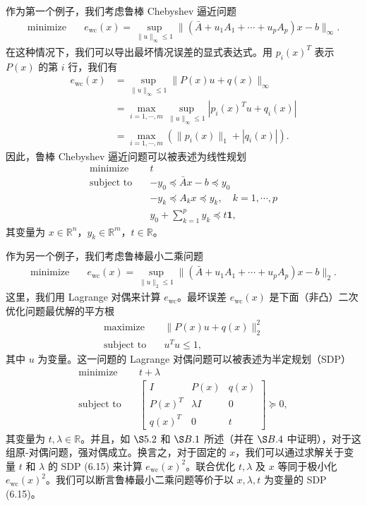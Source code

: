 \documentclass[UTF8,12pt,a4paper,fontset=fandol]{ctexart}
\begin{document}
作为第一个例子，我们考虑鲁棒 Chebyshev 逼近问题
\[
\begin{aligned}
\text{minimize}\quad & e_{\mathrm{wc}}(x)=\sup_{\|u\|_\infty\leq 1}\|(\bar{A}+u_1A_1+\cdots+u_pA_p)x-b\|_\infty.
\end{aligned}
\]
在这种情况下，我们可以导出最坏情况误差的显式表达式。用 $p_i(x)^T$ 表示 $P(x)$ 的第 $i$ 行，我们有
\[
\begin{aligned}
e_{\mathrm{wc}}(x)
&=\sup_{\|u\|_\infty\leq 1}\|P(x)u+q(x)\|_\infty\\
&=\max_{i=1,\cdots,m}\sup_{\|u\|_\infty\leq 1}|p_i(x)^Tu+q_i(x)|\\
&=\max_{i=1,\cdots,m}(\|p_i(x)\|_1+|q_i(x)|).
\end{aligned}
\]
因此，鲁棒 Chebyshev 逼近问题可以被表述为线性规划
\[
\begin{aligned}
\text{minimize}\quad & t\\
\text{subject to}\quad & -y_0\preceq \bar{A}x-b\preceq y_0\\
& -y_k\preceq A_kx\preceq y_k,\quad k=1,\cdots,p\\
& y_0+\sum_{k=1}^p y_k\preceq t\mathbf{1},
\end{aligned}
\]
其变量为 $x\in\mathbb{R}^n$，$y_k\in\mathbb{R}^m$，$t\in\mathbb{R}$。

作为另一个例子，我们考虑鲁棒最小二乘问题
\[
\begin{aligned}
\text{minimize}\quad & e_{\mathrm{wc}}(x)=\sup_{\|u\|_2\leq 1}\|(\bar{A}+u_1A_1+\cdots+u_pA_p)x-b\|_2.
\end{aligned}
\]
这里，我们用 Lagrange 对偶来计算 $e_{\mathrm{wc}}$。最坏误差 $e_{\mathrm{wc}}(x)$ 是下面（非凸）二次优化问题最优解的平方根
\[
\begin{aligned}
\text{maximize}\quad & \|P(x)u+q(x)\|_2^2\\
\text{subject to}\quad & u^Tu\leq 1,
\end{aligned}
\]
其中 $u$ 为变量。这一问题的 Lagrange 对偶问题可以被表述为半定规划（SDP）
\begin{equation}
\begin{aligned}
\text{minimize}\quad & t+\lambda\\
\text{subject to}\quad &
\begin{bmatrix}
I & P(x) & q(x)\\
P(x)^T & \lambda I & 0\\
q(x)^T & 0 & t
\end{bmatrix}\succeq 0,
\end{aligned}
\tag{6.15}
\end{equation}
其变量为 $t,\lambda\in\mathbb{R}$。并且，如 $\S 5.2$ 和 $\S B.1$ 所述（并在 $\S B.4$ 中证明），对于这组原-对偶问题，强对偶成立。换言之，对于固定的 $x$，我们可以通过求解关于变量 $t$ 和 $\lambda$ 的 SDP (6.15) 来计算 $e_{\mathrm{wc}}(x)^2$。联合优化 $t,\lambda$ 及 $x$ 等同于极小化 $e_{\mathrm{wc}}(x)^2$。我们可以断言鲁棒最小二乘问题等价于以 $x,\lambda,t$ 为变量的 SDP (6.15)。
\end{document}
